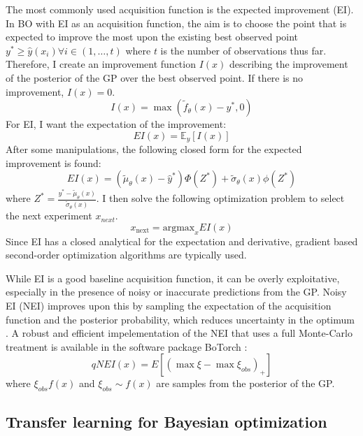 The most commonly used acquisition function is the expected improvement (EI). In BO with EI as an acquisition function, the aim is to choose the point that is expected to improve the most upon the existing best observed point $y^* \geq \hat y(x_i) \forall i \in (1, \dots, t)$  where  $t$ is the number of observations thus far. Therefore, I create an improvement function $I(x)$ describing the improvement of the posterior of the GP over the best observed point. If there is no improvement, $I(x)=0$.
\begin{equation}
    I(x) = \max(\tilde f_{\theta}(x) -y^*, 0)
\end{equation}
For EI, I want the expectation of the improvement:
\begin{equation}
    EI(x) = \mathbb E_{y}[I(x)]
\end{equation}
After some manipulations, the following closed form for the expected improvement is found:
\begin{equation}
    EI(x) =(\tilde \mu_{\theta}(x)-\hat y^*)\Phi(Z^*) + \tilde \sigma_{\theta}(x) \phi(Z^*)
\end{equation}
where $Z^*= \frac{y^*-\tilde\mu_{\theta}(x)}{\tilde \sigma_{\theta}(x)}$.  I then solve the following optimization problem to select the next experiment $x_{next}$.
\begin{equation}
    x_{\text{next}} = \text{argmax}_{x} EI(x)
\end{equation}
Since EI has a closed analytical for the expectation and derivative, gradient based second-order optimization algorithms are typically used. 

While EI is a good baseline acquisition function, it can be overly exploitative, especially in the presence of noisy or inaccurate predictions from the GP.  Noisy EI (NEI) improves upon this by sampling the expectation of the acquisition function and the posterior probability, which reduces uncertainty in the optimum \cite{Letham2019}. A robust and efficient impelementation of the NEI that uses a full Monte-Carlo treatment is available in the software package BoTorch \cite{Balandat2020}:
\begin{equation}
qNEI(x)= E[(\max \xi  - \max \xi_{obs} )_+]
\end{equation}
where $\xi_{obs} f(x)$ and $\xi_{obs}\sim f(x)$ are samples from the posterior of the GP.

\subsection{Transfer learning for Bayesian optimization}

